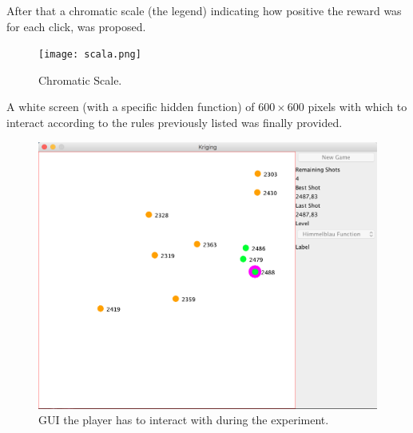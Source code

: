 After that a chromatic scale (the legend) indicating how positive the reward was for each click, was proposed.

\begin{figure}[h!]
	\centering
	\texttt{[image: scala.png]}
	\caption{Chromatic Scale.}
	\label{fig:Cromatic Scale}
\end{figure}

A white screen (with a specific hidden function) of $600 \times 600$ pixels with which to interact according to the rules previously listed was finally provided.

\begin{figure} [h!]
	\centering
	\includegraphics[width= \textwidth, height= 8 cm]{IMAGES/Form}
	\caption{GUI the player has to interact with during the experiment.}
	\label{fig:form}
\end{figure}






